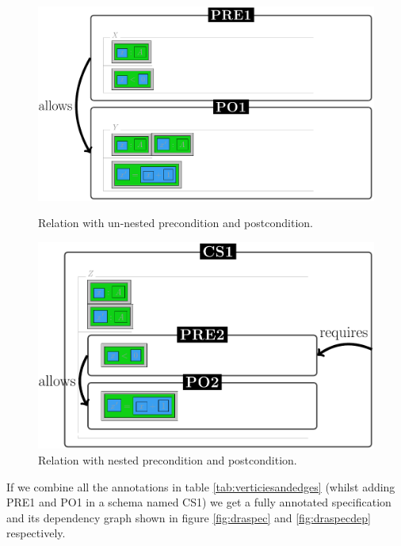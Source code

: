 \begin{figure}[H]
\centering
\begin{minipage}{0.45\textwidth}
\centering
\includegraphics[scale=0.18]{Figures/Formalising/unnested.png}
\caption{Relation with un-nested precondition and postcondition.  \label{fig:unnested}}
\end{minipage}\hfill
\begin{minipage}{0.45\textwidth}
\centering
\includegraphics[scale=0.18]{Figures/Formalising/nested.png}
\caption{Relation with nested precondition and postcondition.  \label{fig:nested}}
\end{minipage}
\end{figure}

If we combine all the annotations in table \ref{tab:verticiesandedges} (whilst adding PRE1 and PO1 in a schema named CS1) we get a fully annotated specification and its dependency graph shown in figure \ref{fig:draspec} and \ref{fig:draspecdep} respectively.

